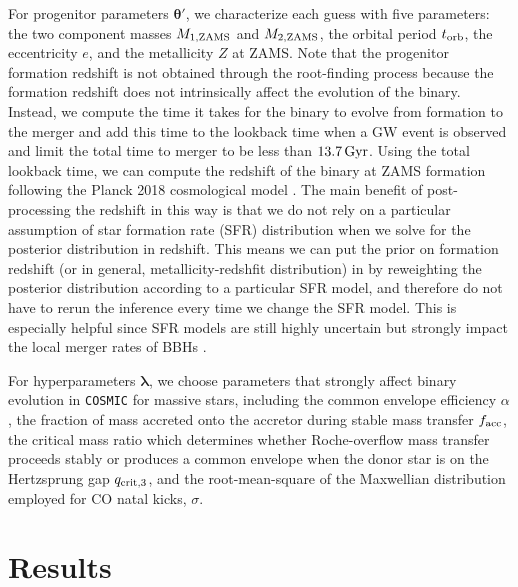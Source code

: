 \documentclass[linenumbers,twocolumn]{aastex631}
\begin{document}
For progenitor parameters $\bm{\theta'}$, we characterize each guess with
five parameters: the two component masses $M_{\rm 1,ZAMS}$ and $M_{\rm 2,ZAMS}$, the orbital period $t_{\rm orb}$,
the eccentricity $e$, and the metallicity $Z$ at ZAMS. Note that the progenitor formation redshift is not
obtained through the root-finding process because the formation redshift does not intrinsically affect
the evolution of the binary. Instead, we compute the time it takes for the binary to evolve from
formation to the merger and add this time to the lookback time when a GW event is observed and limit the total
time to merger to be less than $13.7\,\rm{Gyr}$.
Using the total lookback time, we can compute the redshift of the binary at ZAMS formation following the
Planck 2018 cosmological model \citep{Planck2018}.
The main benefit of post-processing the redshift in this way is that we do not rely on a particular assumption
of star formation rate (SFR) distribution when we solve for the posterior distribution in redshift.
This means we can put the prior on formation redshift (or in general, metallicity-redshfit distribution) in
by reweighting the posterior distribution according to a particular SFR model,
and therefore do not have to rerun the inference every time we change the SFR model. This is especially helpful
since SFR models are still highly uncertain but strongly impact the local merger rates of BBHs \citep[e.g. ][]{Broekgaarden2021}.

For hyperparameters $\bm{\lambda}$, we choose parameters that strongly affect
binary evolution in \texttt{COSMIC} for massive stars, including the common envelope
efficiency $\alpha$, the fraction of mass accreted onto the accretor during stable mass transfer $f_{\rm acc}$,
the critical mass ratio which determines whether Roche-overflow mass transfer
proceeds stably or produces a common envelope when the donor star is on the Hertzsprung gap
$q_{\rm crit,3}$, and the root-mean-square of the Maxwellian distribution
employed for CO natal kicks, $\sigma$. 



\section{Results}
\label{sec:result}
\end{document}

